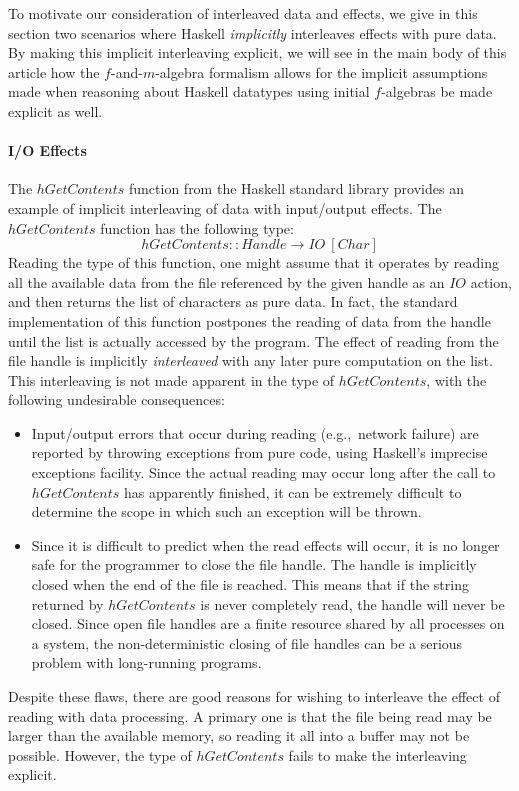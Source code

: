 \documentclass{jfp1}
\begin{document}
To motivate our consideration of interleaved data and effects, we give
in this section two scenarios where Haskell \emph{implicitly}
interleaves effects with pure data. By making this implicit
interleaving explicit, we will see in the main body of this article
how the $f$-and-$m$-algebra formalism allows for the implicit
assumptions made when reasoning about Haskell datatypes using initial
$f$-algebras be made explicit as well.

\paragraph{I/O Effects}

The $\mathit{hGetContents}$ function from the Haskell standard library
provides an example of implicit interleaving of data with input/output
effects. The $\mathit{hGetContents}$ function has the following type:
\begin{displaymath}
  \mathit{hGetContents} :: \mathit{Handle} \to \mathit{IO}~[\mathit{Char}]
\end{displaymath}
Reading the type of this function, one might assume that it operates
by reading all the available data from the file referenced by the
given handle as an $\mathit{IO}$ action, and then returns the list of
characters as pure data. In fact, the standard implementation of this
function postpones the reading of data from the handle until the list
is actually accessed by the program. The effect of reading from the
file handle is implicitly \emph{interleaved} with any later pure
computation on the list. This interleaving is not made apparent in the
type of $\mathit{hGetContents}$, with the following undesirable
consequences:
\begin{itemize}
\item Input/output errors that occur during reading (e.g.,~network
  failure) are reported by throwing exceptions from pure code, using
  Haskell's imprecise exceptions facility. Since the actual reading
  may occur long after the call to $\mathit{hGetContents}$ has
  apparently finished, it can be extremely difficult to determine the
  scope in which such an exception will be thrown.
\item Since it is difficult to predict when the read effects will
  occur, it is no longer safe for the programmer to close the file
  handle. The handle is implicitly closed when the end of the file is
  reached. This means that if the string returned by
  $\mathit{hGetContents}$ is never completely read, the handle will
  never be closed. Since open file handles are a finite resource
  shared by all processes on a system, the non-deterministic closing
  of file handles can be a serious problem with long-running programs.
\end{itemize}
Despite these flaws, there are good reasons for wishing to interleave
the effect of reading with data processing. A primary one is that the
file being read may be larger than the available memory, so reading it
all into a buffer may not be possible. However, the type of
$\mathit{hGetContents}$ fails to make the interleaving explicit.
\end{document}

